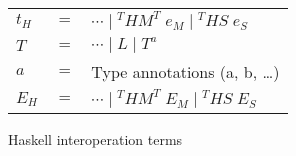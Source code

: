 \begin{figure}
\begin{center}
\begin{tabular}{lcl}
$t_{H}$ & $=$ & $\cdots\;\vert\;^{T}HM^{T}\;e_{M}\;\vert\;^{T}HS\;e_{S}$ \\
$T$ & $=$ & $\cdots\;\vert\;L\;\vert\;T^{a}$ \\
$a$ & $=$ & Type annotations (a, b, \ldots) \\
$E_{H}$ & $=$ & $\cdots\;\vert\;^{T}HM^{T}\;E_{M}\;\vert\;^{T}HS\;E_{S}$
\end{tabular}
\end{center}
\caption{Haskell interoperation terms}
\label{fig:hit}
\end{figure}